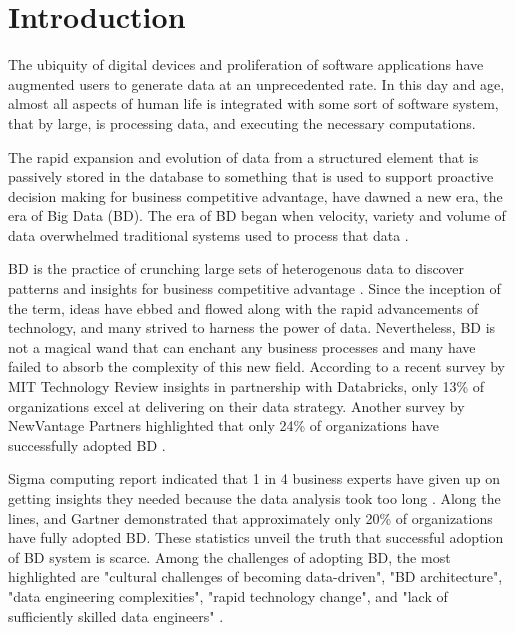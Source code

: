 \documentclass[runningheads]{llncs}
\begin{document}
\section{Introduction}
The ubiquity of digital devices and proliferation of software applications have augmented users to generate data at an unprecedented rate. In this day and age, almost all aspects of human life is integrated with some sort of software system, that by large, is processing data, and executing the necessary computations. 


The rapid expansion and evolution of data from a structured element that is passively stored in the database to something that is used to support proactive decision making for business competitive advantage, have dawned a new era, the era of Big Data (BD). The era of BD began when velocity, variety and volume of data overwhelmed traditional systems used to process that data \cite{ataei2021neomycelia}\cite{AtaeiACIS}. 

BD is the practice of crunching large sets of heterogenous data to discover patterns and insights for business competitive advantage \cite{AtaeiHype}. Since the inception of the term, ideas have ebbed and flowed along with the rapid advancements of technology, and many strived to harness the power of data. Nevertheless, BD is not a magical wand that can enchant any business processes and many have failed to absorb the complexity of this new field. According to a recent survey by MIT Technology Review insights in partnership with Databricks, only 13\% of organizations excel at delivering on their data strategy. Another survey by NewVantage Partners highlighted that only 24\% of organizations have successfully adopted BD \cite{NewVantageSurvey}. 

Sigma computing report indicated that 1 in 4 business experts have given up on getting insights they needed because the data analysis took too long \cite{SigmaSurvey}. Along the lines, and Gartner \cite{GartnerSury} demonstrated that approximately only 20\% of organizations have fully adopted BD. These statistics unveil the truth that successful adoption of BD system is scarce. Among the challenges of adopting BD, the most highlighted are "cultural challenges of becoming data-driven", "BD architecture", "data engineering complexities", "rapid technology change", and "lack of sufficiently skilled data engineers" \cite{AtaeiBigDataEnvirons}. 
\end{document}
